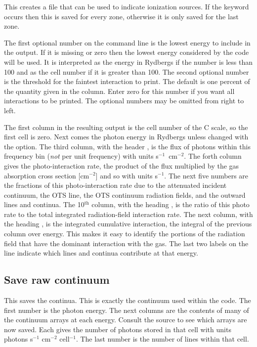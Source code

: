 This creates a file that can be used to indicate ionization sources.
If the keyword  occurs then this is saved for every zone, otherwise
it is only saved for the last zone.

The first optional number on the command line is the lowest energy to
include in the output.  If it is missing or zero then the lowest energy
considered by the code will be used.  It is interpreted as the energy in
Rydbergs if the number is less than 100 and as the cell number if it is
greater than 100.  The second optional number is the threshold for the
faintest interaction to print.  The default is one percent of the quantity
given in the  column.
Enter zero for this number if you want
all interactions to be printed.  The optional numbers may be omitted from
right to left.

The first column in the resulting output is the cell number
of the C scale, so the first cell is zero.
Next comes the photon energy
in Rydbergs unless changed with the  option.  The third column, with
the header , is the flux of photons within this frequency bin
(\emph{not}
per unit frequency) with units s$^{-1}$~cm$^{-2}$.  The forth column gives the
photo-interaction rate, the product of the flux multiplied by the gas
absorption cross section
[cm$^{-2}$] and so with units s$^{-1}$.  The next five numbers are the fractions of
this photo-interaction rate due to the attenuated incident continuum, the
OTS line, the OTS continuum radiation fields, and the outward lines and
continua.  The 10$^{\mathrm{th}}$ column, with the heading , is the ratio
of this photo rate to the total integrated radiation-field interaction rate.
The next column, with the heading , is the integrated cumulative
interaction, the integral of the previous column over energy.  This makes
it easy to identify the portions of the radiation field that have the
dominant interaction with the gas.  The last two labels on the line indicate
which lines and continua contribute at that energy.

\subsection{Save raw continuum}

This saves the  continua.
This is exactly the continuum used
within the code.  The first number is the photon energy.  The next columns
are the contents of many of the continuum arrays at each energy.  Consult
the source to see which arrays are now saved.  Each gives the number of
photons stored in that cell with units photons s$^{-1}$ cm$^{-2}$
cell$^{-1}$.  The last
number is the number of lines within that cell.

